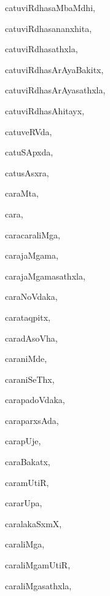 \begin{multicols}{3}
{\noindent
{catuviRdhasaMbaMdhi}, \pageref{catuviRdhasaMbaMdhi}

\noindent
{catuviRdhasananxhita}, \pageref{catuviRdhasananxhita}

\noindent
{catuviRdhasathxla}, \pageref{catuviRdhasathxla}

\noindent
{catuviRdhasArAyaBakitx}, \pageref{catuviRdhasArAyaBakitx}

\noindent
{catuviRdhasArAyasathxla}, \pageref{catuviRdhasArAyasathxla}

\noindent
{catuviRdhasAhitayx}, \pageref{catuviRdhasAhitayx}

\noindent
{catuveRVda}, \pageref{catuveRVda}

\noindent
{catuSApxda}, \pageref{catuSApxda}

\noindent
{catusAsxra}, \pageref{catusAsxra}

\noindent
{caraMta}, \pageref{caraMta}

\noindent
{cara}, \pageref{cara}

\noindent
{caracaraliMga}, \pageref{caracaraliMga}

\noindent
{carajaMgama}, \pageref{carajaMgama}

\noindent
{carajaMgamasathxla}, \pageref{carajaMgamasathxla}

\noindent
{caraNoVdaka}, \pageref{caraNoVdaka}

\noindent
{carataqpitx}, \pageref{carataqpitx}

\noindent
{caradAsoVha}, \pageref{caradAsoVha}

\noindent
{caraniMde}, \pageref{caraniMde}

\noindent
{caraniSeThx}, \pageref{caraniSeThx}

\noindent
{carapadoVdaka}, \pageref{carapadoVdaka}

\noindent
{caraparxsAda}, \pageref{caraparxsAda}

\noindent
{carapUje}, \pageref{carapUje}

\noindent
{caraBakatx}, \pageref{caraBakatx}

\noindent
{caramUtiR}, \pageref{caramUtiR}

\noindent
{cararUpa}, \pageref{cararUpa}

\noindent
{caralakaSxmX}, \pageref{caralakaSxmX}

\noindent
{caraliMga}, \pageref{caraliMga}

\noindent
{caraliMgamUtiR}, \pageref{caraliMgamUtiR}

\noindent
{caraliMgasathxla}, \pageref{caraliMgasathxla}

}
\end{multicols}
